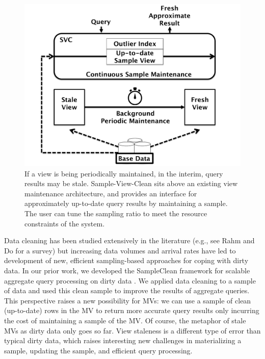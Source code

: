 \begin{figure}[t] \vspace{-2em}
\centering
 \includegraphics[scale=0.25]{figs/sys-arch.pdf} \vspace{-.25em}
 \caption{If a view is being periodically maintained, in the interim, query results may be stale. Sample-View-Clean sits above an existing view maintenance architecture, and provides an interface for approximately up-to-date query results by maintaining a sample. The user can tune the sampling ratio to meet the resource constraints of the system.\label{sys-arch}}\vspace{-1.75em}
\end{figure}

Data cleaning has been studied extensively in the literature (e.g., see Rahm and Do for a survey\cite{rahm2000data}) but increasing data volumes and arrival rates have led to development of new, efficient sampling-based approaches for coping with dirty data.   
In our prior work, we developed the SampleClean framework for scalable aggregate query processing on dirty data \cite{wang1999sample}.
We applied data cleaning to a sample of data and used this clean sample to improve the results of aggregate queries.
This perspective raises a new possibility for MVs: we can use a sample of clean (up-to-date) rows in the MV to return more accurate query results only incurring the cost of maintaining a sample of the MV.
Of course, the metaphor of stale MVs as dirty data only goes so far. 
View staleness is a different type of error than typical dirty data, which raises interesting new challenges in materializing a sample, updating the sample, and efficient query processing.

